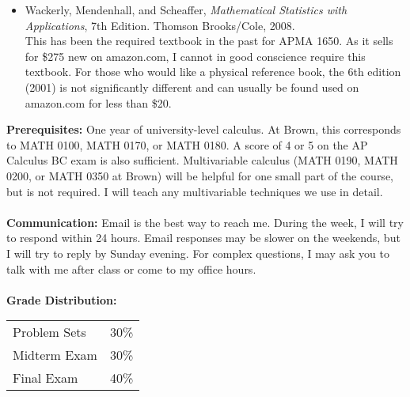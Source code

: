 \documentclass[11pt]{article}
\begin{document}
\begin{itemize}
\item Wackerly, Mendenhall, and Scheaffer, \emph{Mathematical Statistics with Applications}, 7th Edition. Thomson Brooks/Cole, 2008. \\

This has been the required textbook in the past for APMA 1650. As it sells for \$275 new on amazon.com, I cannot in good conscience require this textbook. For those who would like a physical reference book, the 6th edition (2001) is not significantly different and can usually be found used on amazon.com for less than \$20.
\end{itemize}
\textbf {Prerequisites:} One year of university-level calculus. At Brown, this corresponds to MATH 0100, MATH 0170, or MATH 0180. A score of 4 or 5 on the AP Calculus BC exam is also sufficient. Multivariable calculus (MATH 0190, MATH 0200, or MATH 0350 at Brown) will be helpful for one small part of the course, but is not required. I will teach any multivariable techniques we use in detail.\\\\
\textbf{Communication: }Email is the best way to reach me. During the week, I will try to respond within 24 hours. Email responses may be slower on the weekends, but I will try to reply by Sunday evening. For complex questions, I may ask you to talk with me after class or come to my office hours.
 \\\\
\textbf {Grade Distribution:} \\
\hspace*{40mm}
\begin{tabular}{ l l }
Problem Sets & 30\% \\
Midterm Exam  & 30\% \\
Final Exam  & 40\%
\end{tabular} \\\\
\end{document}
